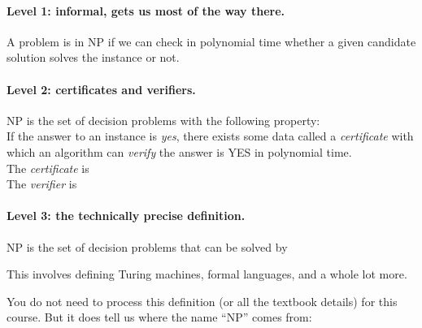 \documentclass[11  pt]{article}
\begin{document}
	\paragraph{Level 1: informal, gets us most of the way there.}
	A problem is in NP if we can check in polynomial time whether a given candidate solution solves the instance or not.\\
	
	
	
	
	\vs{6cm}
	
	\paragraph{Level 2: certificates and verifiers.}
	NP is the set of decision problems with the following property: \\
	
	If the answer to an instance is \emph{yes}, there exists some data called a \emph{certificate} with which an algorithm can \emph{verify} the answer is YES in polynomial time. \\
	
	The \emph{certificate} is \\%
	
	
	The \emph{verifier} is  \\ %
	
	
	\newpage
	\paragraph{Level 3: the technically precise definition.}
	NP is the set of decision problems that can be solved by 
	
		\vs{2cm}
		
	This involves defining Turing machines, formal languages, and a whole lot more.

	\vs{2cm}
	
	You do not need to process this definition (or all the textbook details) for this course. But it does tell us where the name ``NP'' comes from:\\
	
	
	
	\newpage
	
\end{document}
